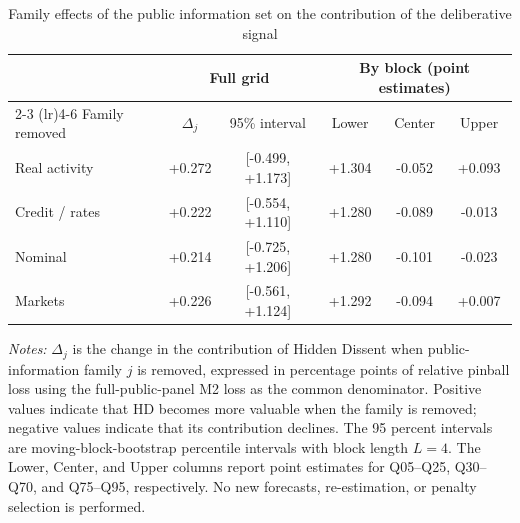 \begin{table}[!htbp]
\centering
\caption{Family effects of the public information set on the contribution of the deliberative signal}
\label{tab:information_family_effects}
\begin{tabular}{lccccc}
\toprule
& \multicolumn{2}{c}{Full grid}
& \multicolumn{3}{c}{By block (point estimates)} \\
\cmidrule(lr){2-3}
\cmidrule(lr){4-6}
Family removed
& $\Delta_j$
& 95\% interval
& Lower
& Center
& Upper \\
\midrule
Real activity & +0.272 & [-0.499, +1.173] & +1.304 & -0.052 & +0.093 \\
Credit / rates & +0.222 & [-0.554, +1.110] & +1.280 & -0.089 & -0.013 \\
Nominal & +0.214 & [-0.725, +1.206] & +1.280 & -0.101 & -0.023 \\
Markets & +0.226 & [-0.561, +1.124] & +1.292 & -0.094 & +0.007 \\
\bottomrule
\end{tabular}

\begin{minipage}{0.96\textwidth}
\footnotesize
\textit{Notes:}
$\Delta_j$ is the change in the contribution of Hidden
Dissent when public-information family $j$ is removed,
expressed in percentage points of relative pinball loss
using the full-public-panel M2 loss as the common
denominator. Positive values indicate that HD becomes
more valuable when the family is removed; negative
values indicate that its contribution declines.
The 95 percent intervals are moving-block-bootstrap
percentile intervals with block length $L=4$.
The Lower, Center, and Upper columns report point
estimates for Q05--Q25, Q30--Q70, and Q75--Q95,
respectively. No new forecasts, re-estimation, or
penalty selection is performed.
\end{minipage}
\end{table}
